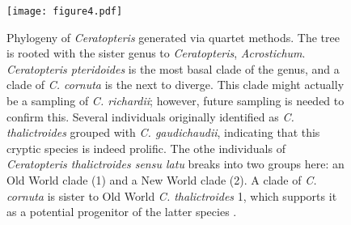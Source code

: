 \documentclass[12pt]{article}
\begin{document}
\begin{figure}[H]
\centering
\texttt{[image: figure4.pdf]}
\caption{Phylogeny of \textit{Ceratopteris} generated via quartet methods. The tree is rooted with the sister genus to \textit{Ceratopteris}, \textit{Acrostichum}. \textit{Ceratopteris pteridoides} is the most basal clade of the genus, and a clade of \textit{C. cornuta} is the next to diverge. This clade might actually be a sampling of \textit{C. richardii}; however, future sampling is needed to confirm this. Several individuals originally identified as \textit{C. thalictroides} grouped with \textit{C. gaudichaudii}, indicating that this cryptic species is indeed prolific. The othe individuals of \textit{Ceratopteris thalictroides sensu latu} breaks into two groups here: an Old World clade (1) and a New World clade (2). A clade of \textit{C. cornuta} is sister to Old World \textit{C. thalictroides} 1, which supports it as a potential progenitor of the latter species \autocite{Adjie2007}.}
\label{phy}
\end{figure}

\vspace{30cm}
\printbibliography
\end{document}

